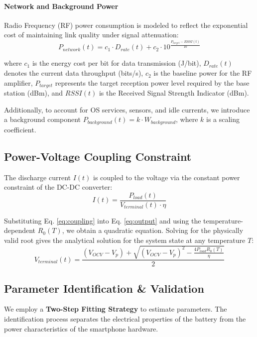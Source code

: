 \documentclass{mcmthesis}
\newcommand{\Vterm}{V_{terminal}}
\newcommand{\Vocv}{V_{OCV}}
\newcommand{\Pload}{P_{load}}
\newcommand{\Vp}{V_{p}}
\begin{document}
\paragraph{Network and Background Power}
Radio Frequency (RF) power consumption is modeled to reflect the exponential cost of maintaining link quality under signal attenuation:
\begin{equation}
P_{network}(t) = c_1 \cdot D_{rate}(t) + c_2 \cdot 10^{\frac{P_{target} - RSSI(t)}{10}}
\end{equation}

where $c_1$ is the energy cost per bit for data transmission (J/bit), $D_{rate}(t)$ denotes the current data throughput (bits/s), $c_2$ is the baseline power for the RF amplifier, $P_{target}$ represents the target reception power level required by the base station (dBm), and $RSSI(t)$ is the Received Signal Strength Indicator (dBm).

Additionally, to account for OS services, sensors, and idle currents, we introduce a background component $P_{background}(t) = k \cdot W_{background}$, where $k$ is a scaling coefficient.

\subsection{Power-Voltage Coupling Constraint}
The discharge current $I(t)$ is coupled to the voltage via the constant power constraint of the DC-DC converter:
\begin{equation} \label{eq:coupling}
I(t) = \frac{\Pload(t)}{\Vterm(t) \cdot \eta}
\end{equation}

Substituting Eq. \eqref{eq:coupling} into Eq. \eqref{eq:output} and using the temperature-dependent $R_0(T)$, we obtain a quadratic equation. Solving for the physically valid root gives the analytical solution for the system state at any temperature $T$:
\begin{equation} \label{eq:vterm_solution}
\Vterm(t) = \frac{(\Vocv - \Vp) + \sqrt{(\Vocv - \Vp)^2 - \frac{4 \Pload R_0(T)}{\eta}}}{2}
\end{equation}

\subsection{Parameter Identification \& Validation}
We employ a \textbf{Two-Step Fitting Strategy} to estimate parameters. The identification process separates the electrical properties of the battery from the power characteristics of the smartphone hardware.
\end{document}
